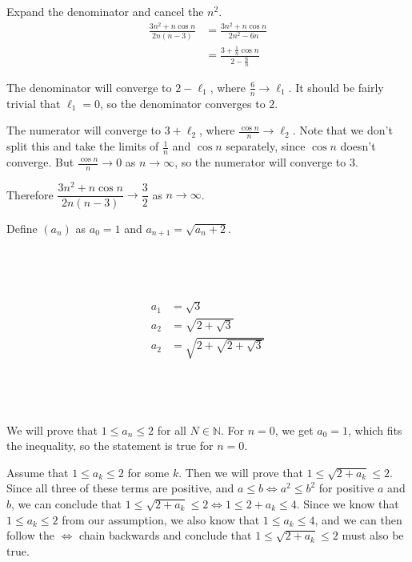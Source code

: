 \documentclass[a4paper]{article}
\begin{document}
Expand the denominator and cancel the $n^2$.
\begin{align*}
	\frac{3n^2 + n\cos n}{2n (n-3)} &= \frac{3n^2 + n\cos n}{2n^2 - 6n}\\[1ex]
									&= \frac{3 + \frac1n \cos n}{2 - \frac6n}
\end{align*}

The denominator will converge to $2 - \ell_1$, where $\frac6n \to \ell_1$. It should be fairly trivial that $\ell_1 = 0$, so the denominator converges to $2$.

The numerator will converge to $3 + \ell_2$, where $\frac{\cos n}{n} \to \ell_2$. Note that we don't split this and take the limits of $\frac1n$ and $\cos n$ separately, since $\cos n$ doesn't converge. But $\frac{\cos n}{n} \to 0$ as $n \to \infty$, so the numerator will converge to $3$.

Therefore $\dfrac{3n^2 + n\cos n}{2n (n-3)} \to \dfrac32$ as $n \to \infty$.


\renewcommand{\thesubsection}{Q\arabic{section}~(\roman{subsection})}


Define $(a_n)$ as $a_0 = 1$ and $a_{n+1} = \sqrt{a_n + 2}$.

\subsection{~}

\begin{align*}
	a_1 &= \sqrt3\\[1ex]
	a_2 &= \sqrt{2 + \sqrt3}\\[1ex]
	a_2 &= \sqrt{2 + \sqrt{2 + \sqrt3}}
\end{align*}

\subsection{~}

We will prove that $1 \le a_n \le 2$ for all $N \in \mathbb N$. For $n=0$, we get $a_0 = 1$, which fits the inequality, so the statement is true for $n=0$.

Assume that $1 \le a_k \le 2$ for some $k$. Then we will prove that $1 \le \sqrt{2 + a_k} \le 2$. Since all three of these terms are positive, and $a \le b \iff a^2 \le b^2$ for positive $a$ and $b$, we can conclude that $1 \le \sqrt{2 + a_k} \le 2 \iff 1 \le 2 + a_k \le 4$. Since we know that $1 \le a_k \le 2$ from our assumption, we also know that $1 \le a_k \le 4$, and we can then follow the $\iff$ chain backwards and conclude that $1 \le \sqrt{2 + a_k} \le 2$ must also be true.
\end{document}
